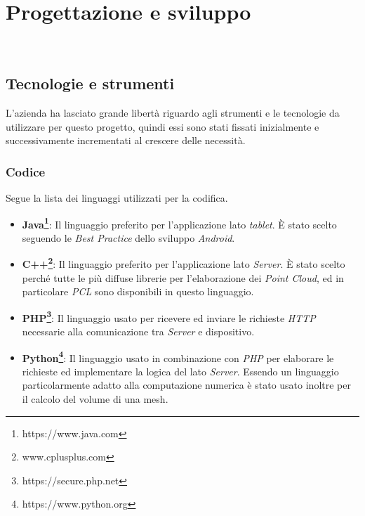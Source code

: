 
\chapter{Progettazione e sviluppo}
\label{cap:progettazione-codifica}

\\

\section{Tecnologie e strumenti}
\label{sec:tecnologie-strumenti}

L'azienda ha lasciato grande libertà riguardo agli strumenti e le tecnologie da utilizzare per questo progetto, quindi essi sono stati fissati inizialmente e successivamente incrementati al crescere delle necessità.

\subsection{Codice}
Segue la lista dei linguaggi utilizzati per la codifica.
\begin{itemize}
	\item \textbf{Java\footnote{https://www.java.com}}: Il linguaggio preferito per l'applicazione lato \emph{tablet}. È stato scelto seguendo le \emph{Best Practice} dello sviluppo \emph{Android}.
	\item \textbf{C++\footnote{www.cplusplus.com}}: Il linguaggio preferito per l'applicazione lato \emph{Server}. È stato scelto perché tutte le più diffuse librerie per l'elaborazione dei \emph{Point Cloud}, ed in particolare \emph{PCL} sono disponibili in questo linguaggio.
	\item \textbf{PHP\footnote{https://secure.php.net}}: Il linguaggio usato per ricevere ed inviare le richieste \emph{HTTP} necessarie alla comunicazione tra \emph{Server} e dispositivo.
	\item \textbf{Python\footnote{https://www.python.org}}: Il linguaggio usato in combinazione con \emph{PHP} per elaborare le richieste ed implementare la logica del lato \emph{Server}. Essendo un linguaggio particolarmente adatto alla computazione numerica è stato usato inoltre per il calcolo del volume di una mesh.
\end{itemize}

